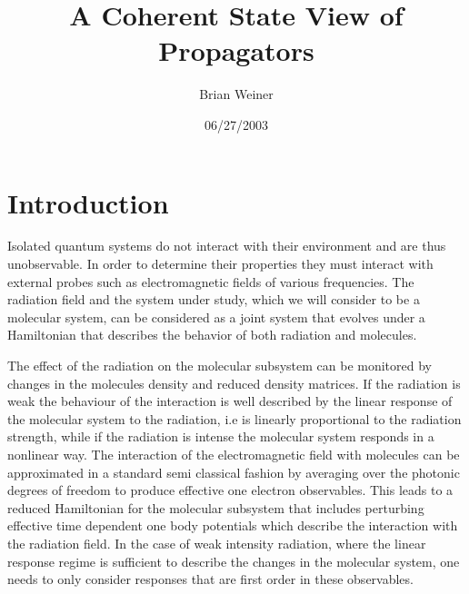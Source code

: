 \documentclass[aps,preprint]{revtex4}%
\begin{document}
\preprint{ }
\title[Coh. State Prop.]{A Coherent State View of Propagators}
\author{Brian Weiner}
\keywords{}
\begin{abstract}


\end{abstract}
\date{06/27/2003}
\maketitle
\tableofcontents


\section{Introduction\label{intro}}

Isolated quantum systems do not interact with their environment and are thus
unobservable. In order to determine their properties they must interact with
external probes such as electromagnetic fields of various frequencies. The
radiation field and the system under study, which we will consider to be a
molecular system, can be considered as a joint system that evolves under a
Hamiltonian that describes the behavior of both radiation and molecules.

The effect of the radiation on the molecular subsystem can be monitored by
changes in the molecules density and reduced density matrices. If the
radiation is weak the behaviour of the interaction is well described by the
linear response of the molecular system to the radiation, i.e is linearly
proportional to the radiation strength, while if the radiation is intense the
molecular system responds in a nonlinear way. The interaction of the
electromagnetic field with molecules can be approximated in a standard semi
classical fashion by averaging over the photonic degrees of freedom to produce
effective one electron observables. This leads to a reduced Hamiltonian for
the molecular subsystem that includes perturbing effective time dependent one
body potentials which describe the interaction with the radiation field. In
the case of weak intensity radiation, where the linear response regime is
sufficient to describe the changes in the molecular system, one needs to only
consider responses that are first order in these observables.
\end{document}
